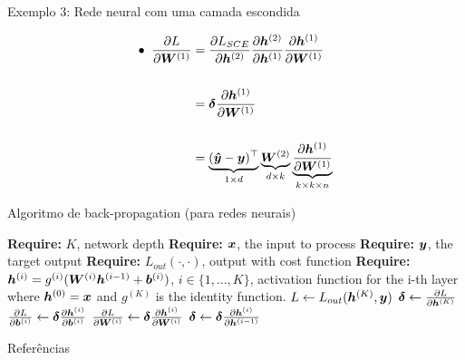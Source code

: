 \documentclass[10pt]{beamer}
\begin{document}
\begin{frame}{Exemplo 3: Rede neural com uma camada escondida}
\Large{

\begin{align*}
\bullet \; \; \frac{\partial L}{\partial \bm{W}^{(1)}}&= \frac{\partial L_{SCE}}{\partial \bm{h}^{(2)}}\frac{\partial \bm{h}^{(2)}}{\partial \bm{h}^{(1)}}\frac{\partial \bm{h}^{(1)}}{\partial \bm{W}^{(1)}}\\
&\\
&= \bm{\delta}\frac{\partial \bm{h}^{(1)}}{\partial \bm{W}^{(1)}}\\
&\\
&= \underbrace{(\bm{\hat{y}} - \bm{y})^{\top}}_{\tiny{1 \times d}} \underbrace{\bm{W}^{(2)}}_{\tiny{d \times k}} \underbrace{\frac{\partial \bm{h}^{(1)}}{\partial \bm{W}^{(1)}}}_{\tiny{k \times k \times n}}\\
\end{align*}
}
\end{frame}

\begin{frame}{Algoritmo de back-propagation (para redes neurais)}
\begin{algorithm}[H]
\begin{algorithmic}[1]
\STATE \textbf{Require:} $K$, network depth
\STATE \textbf{Require:} $\bm{x}$, the input to process
\STATE \textbf{Require:} $\bm{y}$, the target output
\STATE \textbf{Require:} $L_{out}( \cdot ,  \cdot)$, output with cost function
\STATE \textbf{Require:} $\bm{h}^{(i)} = g^{(i)}(\bm{W}^{(i)}\bm{h}^{(i-1)} + \bm{b}^{(i)})$, $i \in \{1, \dots, K\}$, activation function for the i-th layer where $\bm{h}^{(0)} = \bm{x}$ and $g^{(K)}$ is the identity function. 
\STATE $L \leftarrow L_{out}(\bm{h}^{(K)}, \bm{y})$
\STATE $\bm{\delta} \leftarrow \frac{\partial L}{\partial \bm{h}^{(K)}}$
\STATE $\frac{\partial L}{\partial \bm{b}^{(i)}} \leftarrow  \bm{\delta}\frac{\partial \bm{h}^{(i)}}{\partial \bm{b}^{(i)}}$
\STATE $\frac{\partial L}{\partial \bm{W}^{(i)}} \leftarrow  \bm{\delta}\frac{\partial \bm{h}^{(i)}}{\partial \bm{W}^{(i)}}$
\STATE $\bm{\delta} \leftarrow \bm{\delta}\frac{\partial \bm{h}^{(i)}}{\partial \bm{h}^{(i-1)}}$
\ENDFOR
\end{algorithmic}
\caption{Back-propagation for a deep neural network}
\label{alg:seq}
\end{algorithm}
\end{frame}


\begin{frame}[allowframebreaks]{Referências}

  
  

\end{frame}
\end{document}
